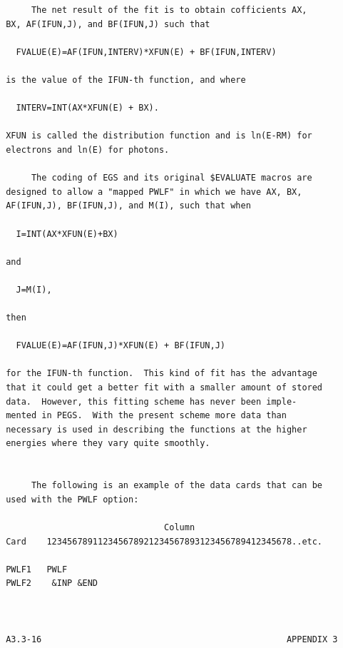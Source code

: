 \newpage {} \begin{verbatim}
      The net result of the fit is to obtain cofficients AX,
 BX, AF(IFUN,J), and BF(IFUN,J) such that
 
   FVALUE(E)=AF(IFUN,INTERV)*XFUN(E) + BF(IFUN,INTERV)
 
 is the value of the IFUN-th function, and where
 
   INTERV=INT(AX*XFUN(E) + BX).
 
 XFUN is called the distribution function and is ln(E-RM) for
 electrons and ln(E) for photons.
 
      The coding of EGS and its original $EVALUATE macros are
 designed to allow a "mapped PWLF" in which we have AX, BX,
 AF(IFUN,J), BF(IFUN,J), and M(I), such that when
 
   I=INT(AX*XFUN(E)+BX)
 
 and
 
   J=M(I),
 
 then
 
   FVALUE(E)=AF(IFUN,J)*XFUN(E) + BF(IFUN,J)
 
 for the IFUN-th function.  This kind of fit has the advantage
 that it could get a better fit with a smaller amount of stored
 data.  However, this fitting scheme has never been imple-
 mented in PEGS.  With the present scheme more data than
 necessary is used in describing the functions at the higher
 energies where they vary quite smoothly.
 
 
      The following is an example of the data cards that can be
 used with the PWLF option:
 
                                Column
 Card    123456789112345678921234567893123456789412345678..etc.
 
 PWLF1   PWLF
 PWLF2    &INP &END

 
 
 A3.3-16                                                APPENDIX 3
\end{verbatim} 
